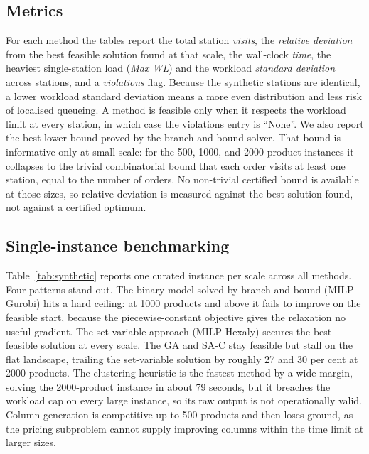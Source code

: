 \documentclass[]{interact}
\begin{document}
\subsection{Metrics}
For each method the tables report the total station \emph{visits}, the \emph{relative deviation} from the best feasible solution found at that scale, the wall-clock \emph{time}, the heaviest single-station load (\emph{Max WL}) and the workload \emph{standard deviation} across stations, and a \emph{violations} flag. Because the synthetic stations are identical, a lower workload standard deviation means a more even distribution and less risk of localised queueing. A method is feasible only when it respects the workload limit at every station, in which case the violations entry is ``None''. We also report the best lower bound proved by the branch-and-bound solver. That bound is informative only at small scale: for the 500, 1000, and 2000-product instances it collapses to the trivial combinatorial bound that each order visits at least one station, equal to the number of orders. No non-trivial certified bound is available at those sizes, so relative deviation is measured against the best solution found, not against a certified optimum.

\subsection{Single-instance benchmarking}
Table~\ref{tab:synthetic} reports one curated instance per scale across all methods. Four patterns stand out. The binary model solved by branch-and-bound (MILP Gurobi) hits a hard ceiling: at 1000 products and above it fails to improve on the feasible start, because the piecewise-constant objective gives the relaxation no useful gradient. The set-variable approach (MILP Hexaly) secures the best feasible solution at every scale. The GA and SA-C stay feasible but stall on the flat landscape, trailing the set-variable solution by roughly 27 and 30 per cent at 2000 products. The clustering heuristic is the fastest method by a wide margin, solving the 2000-product instance in about 79 seconds, but it breaches the workload cap on every large instance, so its raw output is not operationally valid. Column generation is competitive up to 500 products and then loses ground, as the pricing subproblem cannot supply improving columns within the time limit at larger sizes.
\end{document}
